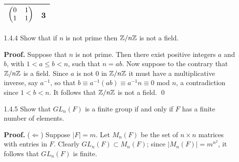 \begin{enumerate}
\begin{center}
\begin{tabular}{@{}|c|c|@{}}
            $\left(\begin{tabular}{@{}cc@{}}
               0 & 1 \\
               1 & 1
            \end{tabular}\right)$            & 3      \\ \hline
         \end{tabular}
      \end{center}
   \item[1.4.4]   Show that if $n$ is not prime then $\mathbb{Z}/n\mathbb{Z}$ is not a field.

      \textbf{Proof.} Suppose that $n$ is not prime. Then there exist positive
      integers $a$ and $b$, with $1 < a \le b < n$, such that $n = ab$. Now
      suppose to the contrary that $\mathbb{Z}/n\mathbb{Z}$ is a field. Since $a$ is not 0 in
      $\mathbb{Z}/n\mathbb{Z}$ it must have a multiplicative inverse, say $a^{-1}$, so that
      $b \equiv a^{-1}(ab) \equiv a^{-1}n \equiv 0$ mod $n$, a contradiction
      since $1 < b < n$. It follows that $\mathbb{Z}/n\mathbb{Z}$ is not a field. \qed
   \item[1.4.5]   Show that $GL_n(F)$ is a finite group if and only if $F$ has a
                  finite number of elements.

      \textbf{Proof.} ($\Leftarrow$) Suppose $|F| = m$. Let $M_n(F)$ be the
      set of $n \times n$ matrices with entries in $F$. Clearly
      $GL_n(F) \subset M_n(F)$; since $|M_n(F)| = m^{n^2}$, it follows that
      $GL_n(F)$ is finite.


\end{enumerate}
